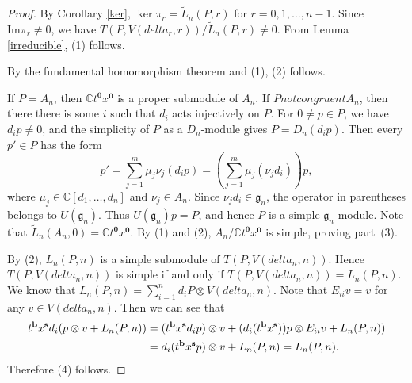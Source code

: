 \documentclass[12pt,a4paper]{amsart}
\def\mg{g}%
\def\gl{gl}%
\def\delta{delta}%
\def\ncong{not congruent}%
\newtheorem{corollary}[theorem]{Corollary}%
\numberwithin{equation}{section}
\newcommand{\C}{\mathbb C}
\def\mg{\mathfrak{g}}
\def\gl{\mathfrak{gl}}
\def\bs{\mathbf{s}}
\def\bb{\mathbf{b}}
\def\bo{\mathbf{0}}
\begin{document}
\begin{proof}
By Corollary \ref{ker}, $\ker\pi_r=\tilde{L}_n(P,r)$ for $r=0,1,\dots, n-1$. Since $\text{Im}\pi_r\neq0$, we have $T(P,V(\delta_r,r))/\tilde{L}_n(P,r)\neq0$. From Lemma \ref{irreducible}, (1) follows.

By the fundamental homomorphism theorem and (1), (2) follows.

If $P=A_n$, then $\C t^{\bo}x^{\bo}$ is a proper submodule
of $A_n$.
If $P\ncong A_n$, then there there is some $i$ such that \(d_i\) acts injectively on \(P\). For \(0\neq p\in P\),
we have \(d_i p\neq0\), and the simplicity of \(P\) as a
\(D_n\)-module gives \(P=D_n(d_i p)\). Then every \(p'\in P\) has the form
\[
p'=\sum_{j=1}^m\mu_j\nu_j(d_i p)
   =\left(\sum_{j=1}^m\mu_j(\nu_jd_i)\right)p,
\]
where \(\mu_j\in\C[d_1,\ldots,d_n]\) and \(\nu_j\in A_n\).
Since \(\nu_jd_i\in\mg_n\), the operator in parentheses belongs to
\(U(\mg_n)\). Thus \(U(\mg_n)p=P\), and hence $P$ is a simple $
\mg_n$-module. Note that $\tilde{L}_n(A_n,0)=\C t^{\bo}x^{\bo}$.
By (1) and (2), $A_n/\C t^{\bo}x^{\bo}$ is simple, proving part~\textup{(3)}.


 By (2), $L_n(P,n)$ is a simple submodule of $T(P,V(\delta_n,n))$. Hence $T(P,V(\delta_n,n))$ is simple if and only if $T(P,V(\delta_n,n))=L_n(P,n)$. We know that $L_n(P,n)=\sum^n_{i=1}d_iP\otimes V(\delta_n,n)$. Note that
 $E_{ii}v=v$ for any $v\in V(\delta_n,n)$. Then we can see that
$$\aligned
t^{\bb}x^{\bs}d_i(p\otimes v+L_n(P,n))
&=(t^{\bb}x^{\bs}d_ip)\otimes v
+(d_i(t^{\bb}x^{\bs}))p\otimes E_{ii}v+L_n(P,n))\\
&=d_i(t^{\bb}x^{\bs}p)\otimes v+L_n(P,n)=L_n(P,n).\endaligned$$
Therefore (4) follows.
\end{proof}



%
%
%
\end{document}
